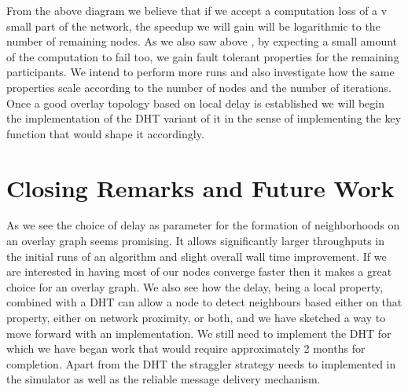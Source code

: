 \documentclass[12pt,notitlepage]{article}
\begin{document}
From the above diagram we believe that if we accept a computation loss of a v small part of the network, the speedup we will gain will be logarithmic
to the number of remaining nodes. As we also saw above , by expecting a small amount of the computation to fail too, we gain fault tolerant properties
for the remaining participants.
We intend to perform more runs and also investigate how the same properties scale according to the number of nodes and the number of iterations. Once a good
overlay topology based on local delay is established we will begin the implementation of the DHT variant of it in the sense of implementing the key function
that would shape it accordingly.

\section{Closing Remarks and Future Work}
As we see the choice of delay as parameter for the formation of neighborhoods on an overlay graph seems promising. It allows significantly larger 
throughputs in the initial runs of an algorithm and slight overall wall time improvement. If we are interested in having most of our nodes converge
faster then it makes a great choice for an overlay graph. We also see how the delay, being a local property, combined with a DHT can allow a node
to detect neighbours based either on that property, either on network proximity, or both, and we have sketched a way to move forward with an implementation.
We still need to implement the DHT for which we have began work that would require approximately 2 months for completion. Apart from the DHT the straggler strategy
needs to implemented in the simulator as well as the reliable message delivery mechanism.



\end{document}

